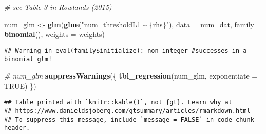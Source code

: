 \documentclass[
]{article}
\newenvironment{Shaded}{\begin{snugshade}}{\end{snugshade}}
\newcommand{\AttributeTok}[1]{\textcolor[rgb]{0.13,0.29,0.53}{#1}}
\newcommand{\CommentTok}[1]{\textcolor[rgb]{0.56,0.35,0.01}{\textit{#1}}}
\newcommand{\ConstantTok}[1]{\textcolor[rgb]{0.56,0.35,0.01}{#1}}
\newcommand{\FunctionTok}[1]{\textcolor[rgb]{0.13,0.29,0.53}{\textbf{#1}}}
\newcommand{\NormalTok}[1]{#1}
\newcommand{\OtherTok}[1]{\textcolor[rgb]{0.56,0.35,0.01}{#1}}
\newcommand{\StringTok}[1]{\textcolor[rgb]{0.31,0.60,0.02}{#1}}
\begin{document}
\begin{Shaded}
\begin{Highlighting}[]
\CommentTok{\# see Table 3 in Rowlands (2015)}

\NormalTok{num\_glm }\OtherTok{\textless{}{-}} \FunctionTok{glm}\NormalTok{(}\FunctionTok{glue}\NormalTok{(}\StringTok{"num\_thresholdL1 \textasciitilde{} \{rhs\}"}\NormalTok{), }\AttributeTok{data =}\NormalTok{ num\_dat, }\AttributeTok{family =} \FunctionTok{binomial}\NormalTok{(), }\AttributeTok{weights =}\NormalTok{ weights)}
\end{Highlighting}
\end{Shaded}

\begin{verbatim}
## Warning in eval(family$initialize): non-integer #successes in a binomial glm!
\end{verbatim}

\begin{Shaded}
\begin{Highlighting}[]
\CommentTok{\# num\_glm}
\FunctionTok{suppressWarnings}\NormalTok{(\{}
  \FunctionTok{tbl\_regression}\NormalTok{(num\_glm, }\AttributeTok{exponentiate =} \ConstantTok{TRUE}\NormalTok{)}
\NormalTok{\})}
\end{Highlighting}
\end{Shaded}

\begin{verbatim}
## Table printed with `knitr::kable()`, not {gt}. Learn why at
## https://www.danieldsjoberg.com/gtsummary/articles/rmarkdown.html
## To suppress this message, include `message = FALSE` in code chunk header.
\end{verbatim}
\end{document}
